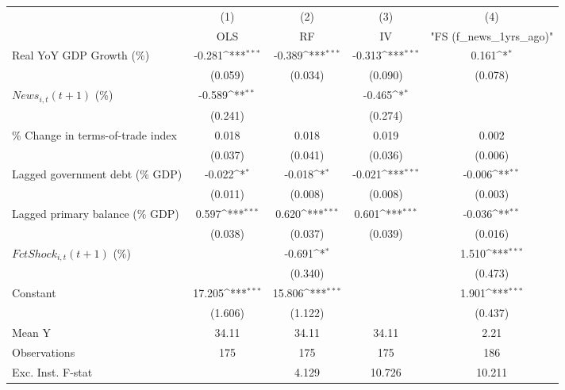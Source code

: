 {
\def\sym#1{\ifmmode^{#1}\else\(^{#1}\)\fi}
\begin{tabular}{l*{4}{c}}
\toprule
                    &\multicolumn{1}{c}{(1)}&\multicolumn{1}{c}{(2)}&\multicolumn{1}{c}{(3)}&\multicolumn{1}{c}{(4)}\\
                    &\multicolumn{1}{c}{OLS}&\multicolumn{1}{c}{RF}&\multicolumn{1}{c}{IV}&\multicolumn{1}{c}{ "FS (f_news_1yrs_ago)" }\\
\midrule
Real YoY GDP Growth (\%)&      -0.281\sym{***}&      -0.389\sym{***}&      -0.313\sym{***}&       0.161\sym{*}  \\
                    &     (0.059)         &     (0.034)         &     (0.090)         &     (0.078)         \\
\addlinespace
$ News_{i,t}(t+1)$ (\%)&      -0.589\sym{**} &                     &      -0.465\sym{*}  &                     \\
                    &     (0.241)         &                     &     (0.274)         &                     \\
\addlinespace
\% Change in terms-of-trade index&       0.018         &       0.018         &       0.019         &       0.002         \\
                    &     (0.037)         &     (0.041)         &     (0.036)         &     (0.006)         \\
\addlinespace
Lagged government debt (\% GDP)&      -0.022\sym{*}  &      -0.018\sym{*}  &      -0.021\sym{***}&      -0.006\sym{**} \\
                    &     (0.011)         &     (0.008)         &     (0.008)         &     (0.003)         \\
\addlinespace
Lagged primary balance (\% GDP)&       0.597\sym{***}&       0.620\sym{***}&       0.601\sym{***}&      -0.036\sym{**} \\
                    &     (0.038)         &     (0.037)         &     (0.039)         &     (0.016)         \\
\addlinespace
$ FctShock_{i,t}(t+1)$ (\%)&                     &      -0.691\sym{*}  &                     &       1.510\sym{***}\\
                    &                     &     (0.340)         &                     &     (0.473)         \\
\addlinespace
Constant            &      17.205\sym{***}&      15.806\sym{***}&                     &       1.901\sym{***}\\
                    &     (1.606)         &     (1.122)         &                     &     (0.437)         \\
\midrule
Mean Y              &       34.11         &       34.11         &       34.11         &        2.21         \\
Observations        &         175         &         175         &         175         &         186         \\
Exc. Inst. F-stat   &                     &       4.129         &      10.726         &      10.211         \\
\bottomrule
\end{tabular}
}
